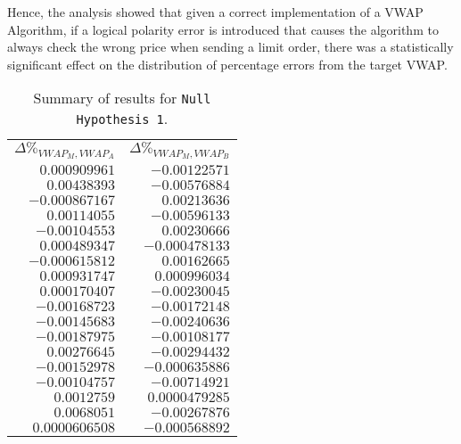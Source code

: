 Hence, the analysis showed that given a correct implementation of a VWAP Algorithm, if a logical polarity error is introduced that causes the algorithm to always check the wrong price when sending a limit order, there was a statistically significant effect on the distribution of percentage errors from the target VWAP. 

\begin{table}[htbp]
\begin{center}
\begin{tabular}{ r r }
$\Delta\%_{VWAP_M, VWAP_A}$ & $\Delta\%_{VWAP_M, VWAP_B}$ \\
\cmidrule(r){1-2}

$0.000909961$	& $-0.00122571$ 	\\
$0.00438393$ 	& $-0.00576884$		\\
$-0.000867167$	& $0.00213636$		\\
$0.00114055$	& $-0.00596133$		\\
$-0.00104553$	& $0.00230666$		\\
$0.000489347$	& $-0.000478133$	\\
$-0.000615812$	& $0.00162665$		\\
$0.000931747$	& $0.000996034$		\\
$0.000170407$	& $-0.00230045$		\\
$-0.00168723$	& $-0.00172148$		\\
$-0.00145683$	& $-0.00240636$		\\	 
$-0.00187975$	& $-0.00108177$		\\
$0.00276645$	& $-0.00294432$		\\
$-0.00152978$	& $-0.000635886$	\\
$-0.00104757$	& $-0.00714921$		\\
$0.0012759$		& $0.0000479285$	\\
$0.0068051$		& $-0.00267876$		\\
$0.0000606508$	& $-0.000568892$	\\

\end{tabular}
\end{center}
\caption{Summary of results for \texttt{Null Hypothesis 1}.}
\label{Tables/Null-Hypothesis-1/Results}
\end{table}

